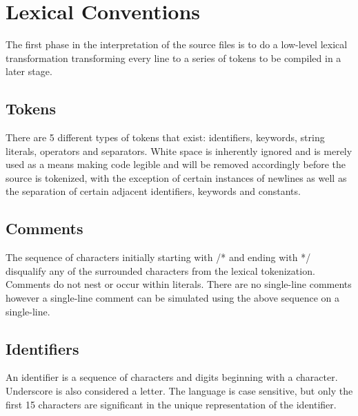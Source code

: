 \documentclass[12pt]{report}
\begin{document}
\section{Lexical Conventions}

\begin{doublespace}
The first phase in the interpretation of the source files is to do a low-level lexical transformation transforming every line to a series of tokens to be compiled in a later stage.
\end{doublespace}

\subsection{Tokens}

\begin{doublespace}
There are 5 different types of tokens that exist: identifiers, keywords, string literals, operators and separators. White space is inherently ignored and is merely used as a means making code legible and will be removed accordingly before the source is tokenized, with the exception of certain instances of newlines as well as the separation of certain adjacent identifiers, keywords and constants.
\end{doublespace}

\subsection{Comments}

\begin{doublespace}
The sequence of characters initially starting with /* and ending with */ disqualify any of the surrounded characters from the lexical tokenization. Comments do not nest or occur within literals. There are no single-line comments however a single-line comment can be simulated using the above sequence on a single-line.
\end{doublespace}

\subsection{Identifiers}

\begin{doublespace}
An identifier is a sequence of characters and digits beginning with a character. Underscore is also considered a letter. The language is case sensitive, but only the first 15 characters are significant in the unique representation of the identifier.
\end{doublespace}
\end{document}
